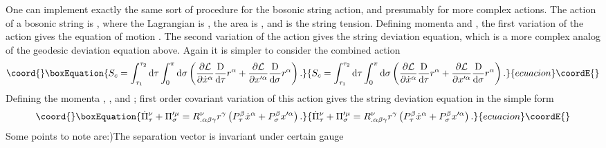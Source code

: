 \documentclass[a4paper,a4paper]{article}
\begin{document}
One can implement exactly the same sort of procedure 
for the bosonic string action,  and presumably for more complex actions.
The action of a bosonic string is
\coordHE{},
where the Lagrangian is
\coordHE{},
the area is
\coordHE{},
and \coordHE{} is the string tension.   Defining momenta
\coordHE{}
and
\coordHE{},
the first variation of the action gives the equation of motion
\coordHE{}.
The second variation of the action gives the string deviation equation,
which is a more complex analog of the geodesic deviation equation above.
Again it is simpler to consider the combined action
\begin{equation}\coord{}\boxEquation{
S_c=\int^{\tau_2}_{\tau_1}{\rm d}\tau\int^\pi_0{\rm d}\sigma
\left(\frac{\partial{\cal{L}}}{\partial\dot{x}^\alpha}
      \frac{{\rm D}}{\rm{d}\tau}r^\alpha
     +\frac{\partial{\cal{L}}}{\partial x'^\alpha}
      \frac{{\rm D}}{\rm{d}\sigma}r^\alpha\right).
}{
S_c=\int^{\tau_2}_{\tau_1}{\rm d}\tau\int^\pi_0{\rm d}\sigma
\left(\frac{\partial{\cal{L}}}{\partial\dot{x}^\alpha}
      \frac{{\rm D}}{\rm{d}\tau}r^\alpha
     +\frac{\partial{\cal{L}}}{\partial x'^\alpha}
      \frac{{\rm D}}{\rm{d}\sigma}r^\alpha\right).
}{ecuacion}\coordE{}\end{equation}
Defining the momenta
\coordHE{},
\coordHE{},
\coordHE{} and
\coordHE{};
first order covariant variation of this action gives 
the string deviation equation in the simple form
\begin{equation}\coord{}\boxEquation{
\dot{\Pi}^\nu_\tau+\Pi'^\mu_\sigma=R^\nu_{.\alpha\beta\gamma}r^\gamma
\left(P^\beta_\tau\dot{x}^\alpha+P^\beta_\sigma x'^\alpha\right).
}{
\dot{\Pi}^\nu_\tau+\Pi'^\mu_\sigma=R^\nu_{.\alpha\beta\gamma}r^\gamma
\left(P^\beta_\tau\dot{x}^\alpha+P^\beta_\sigma x'^\alpha\right).
}{ecuacion}\coordE{}\end{equation}
Some points to note are:)The separation vector \coordHE{} is invariant under certain gauge
\end{document}
